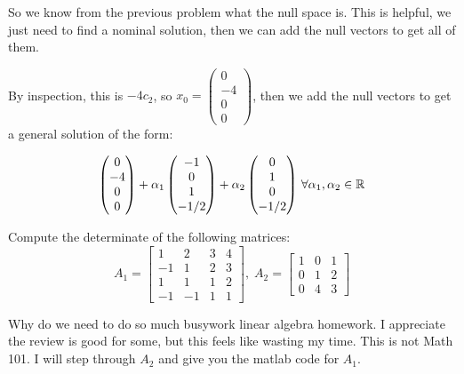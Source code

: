 \documentclass[11pt]{article}
\begin{document}
\soln

So we know from the previous problem what the null space is.
This is helpful, we just need to find a nominal solution, then we can add the null vectors to get all of them.

By inspection, this is $-4 c_2$, so $x_0 = \begin{pmatrix}
    0 \\-4 \\ 0 \\ 0
\end{pmatrix}$,
then we add the null vectors to get a general solution of the form:

$$
\begin{pmatrix}
    0 \\-4 \\ 0 \\ 0
\end{pmatrix} + \alpha_1 \begin{pmatrix}
    -1 \\ 0 \\ 1 \\ -1/2
\end{pmatrix} + \alpha_2 \begin{pmatrix}
    0 \\ 1 \\ 0 \\ -1/2
\end{pmatrix} \, \forall \alpha_1,\alpha_2 \in \mathbb{R}
$$


Compute the determinate of the following matrices:
$$
A_1 = \begin{bmatrix}
    1 & 2 & 3 & 4\\
    -1 & 1 & 2 & 3\\
    1 & 1 & 1 & 2\\
    -1 & -1 & 1 & 1
\end{bmatrix}, \;
A_2 = \begin{bmatrix}
    1 & 0 & 1 \\
    0 & 1 & 2 \\
    0 & 4 & 3
\end{bmatrix}
$$

\soln

Why do we need to do so much busywork linear algebra homework. 
I appreciate the review is good for some, but this feels like wasting my time.
This is not Math 101. I will step through $A_2$ and give you the matlab code for $A_1$.
\end{document}
